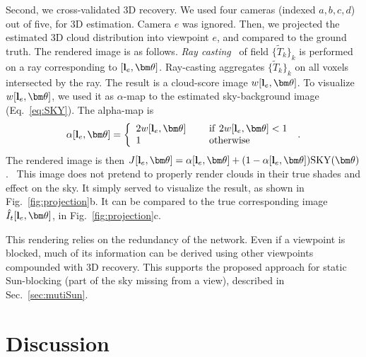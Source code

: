 \documentclass[runningheads]{llncs}
\begin{document}
Second, we cross-validated 3D recovery. We used four cameras (indexed $a,b,c,d$) out of five, for 3D estimation. Camera $e$ was ignored. Then, we projected the estimated 3D cloud distribution into viewpoint $e$, and compared to the ground truth. The rendered image is as follows. {\em Ray casting}~\cite{Levoy1990} of  field $\{\tilde T_k\}_k$ is performed on a ray corresponding to
$[{\bf l}_e,{\bm \theta}]$. Ray-casting aggregates $\{\tilde T_k\}_k$ on all voxels intersected by the ray. The result is a cloud-score image $w[{\bf l}_e,{\bm \theta}]$.
To visualize $w[{\bf l}_e,{\bm \theta}]$, we used it as $\alpha$-map to the estimated sky-background image (Eq.~\ref{eq:SKY}). The alpha-map is
\begin{equation}
 \alpha[{\bf l}_e,{\bm \theta}]=\left\{
      \begin{array}{ll}
      2w[{\bf l}_e,{\bm \theta}]
      & ~~~~{\rm if}~ 2w[{\bf l}_e,{\bm \theta}]<1 \\
      1
      & ~~~~{\rm otherwise}
      \end{array}
      \right.
  \;.
 \label{eq:alpha}
\end{equation}
The rendered image is then
 $J[{\bf l}_e,{\bm \theta}]=
 \alpha[{\bf l}_e,{\bm \theta}]+(1-\alpha[{\bf l}_e,{\bm \theta}]){\rm SKY}({\bm \theta})$.~
This image does not pretend to properly render clouds in their true shades and effect on the sky. It simply served to visualize the result, as shown in Fig.~\ref{fig:projection}b. It can be compared to the true corresponding image $\hat I_t[{\bf l}_e,{\bm \theta}]$, in Fig.~\ref{fig:projection}c.

This rendering relies on the redundancy of the network. Even if a viewpoint is blocked, much of its information can be derived using other viewpoints compounded with 3D recovery. This supports the proposed approach for static Sun-blocking (part of the sky missing from a view), described in Sec.~\ref{sec:mutiSun}.

%


\section{Discussion}
\label{sec:discuss}
\end{document}
